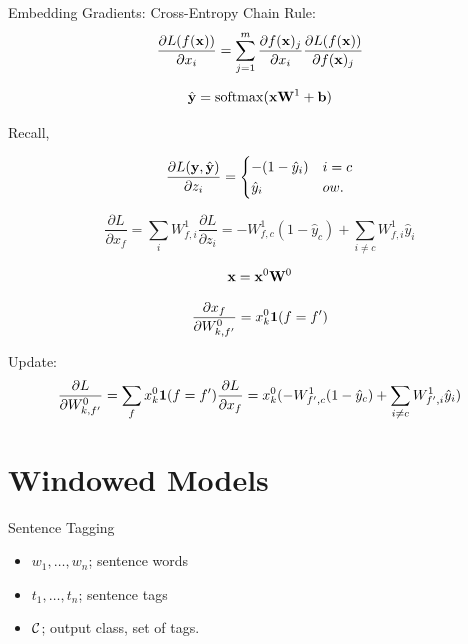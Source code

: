 \documentclass{beamer}
\begin{document}
\begin{frame}[allowframebreaks]{Embedding Gradients: Cross-Entropy}
  Chain Rule:
  \[ \frac{\partial L(f(\mathbf{x}))}{\partial x_i} = \sum_{j =1}^m \frac{\partial f(\mathbf{x})_j} {\partial  x_i} \frac{\partial L(f(\mathbf{x}))} {\partial f(\mathbf{x})_j}   \]


  \[ \hat{\boldy} = \softmax (\boldx \boldW^1 + \boldb) \]




  Recall,

  \[ \frac{\partial L(\mathbf{y}, \hat{\mathbf{y}})}{\partial z_i} =      \begin{cases}
      -(1 - \hat{y}_i) & i = c\\
      \hat{y}_i & ow. \\
    \end{cases} \]



  \[\frac{\partial L}{\partial x_{f}} =
    \sum_{i} W^1_{f, i} \frac{\partial L}{\partial z_{i}} =
     -W^1_{f,c}  (1-\hat{y}_c)  + \sum_{i \neq c} W^1_{f,i}  \hat{y}_i
  \]

  \air
  \air

  \[ \mathbf{x} = \mathbf{x}^0 \mathbf{W}^0 \]

  \[\frac{\partial x_f}{\partial W^0_{k, f'}} = x^0_{k}  \mathbf{1}(f = f')   \]

  Update:
  \[\frac{\partial L}{\partial W^0_{k,f'}} = \sum_{f} x^0_{k} \mathbf{1}(f = f') \frac{\partial L}{\partial x_{f}}  =  x^0_{k}      (-W^1_{f',c} (1-\hat{y}_c)  + \sum_{i \neq c} W^1_{f',i}  \hat{y}_i)  \]
\end{frame}



\section{Windowed Models}




\begin{frame}{Sentence Tagging}
  \begin{itemize}
  \item $w_1, \ldots, w_n$; sentence words
    \air
  \item $t_1, \ldots, t_n$; sentence tags
    \air

  \item $\mathcal{C}$; output class, set of tags.
  \end{itemize}
\end{frame}
\end{document}
